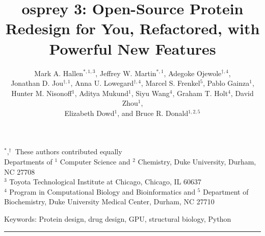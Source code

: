 \documentclass[12pt]{article}
\title{{\sc osprey} 3: Open-Source Protein Redesign for You, Refactored, with Powerful New Features}
\author{Mark A. Hallen$^{*,1,3}$, Jeffrey W. Martin$^{*,1}$, Adegoke Ojewole$^{\dagger,4}$, \\
Jonathan D. Jou$^{\dagger,1}$, Anna U. Lowegard$^{\dagger,4}$, Marcel S. Frenkel$^5$, Pablo Gainza$^1$, \\
Hunter M. Nisonoff$^1$, Aditya Mukund$^1$, Siyu Wang$^4$, Graham T. Holt$^4$, David Zhou$^1$, \\
Elizabeth Dowd$^1$, and Bruce R. Donald$^{1,2,5}$}
\newenvironment{wileykeywords}{\textsf{Keywords:}\hspace{\stretch{1}}}{\hspace{\stretch{1}}\rule{1ex}{1ex}}
\begin{document}
\maketitle


\hspace{-0.25in}$^*,^\dagger$ These authors contributed equally \\
Departments of $^1$ Computer Science and $^2$ Chemistry, Duke University, Durham, NC 27708 \\
$^3$ Toyota Technological Institute at Chicago, Chicago, IL 60637 \\
$^4$ Program in Computational Biology and Bioinformatics and $^5$ Department of Biochemistry, Duke University Medical Center, Durham, NC 27710


\begin{abstract}

\end{abstract}

\begin{wileykeywords}
Protein design, drug design, GPU, structural biology, Python
\end{wileykeywords}

\clearpage



\begin{figure}[h]
\centering
\colorbox{background-color}{
}
\end{figure}
\end{document}
